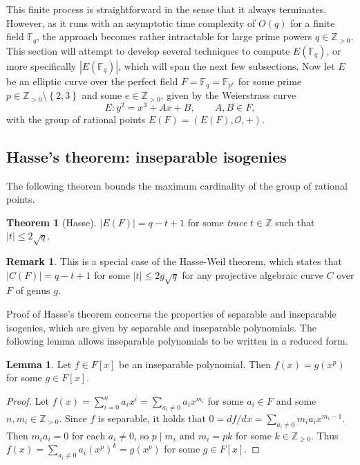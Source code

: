 \documentclass{article}
\newcommand{\F}{\mathbb{F}}
\newcommand{\Z}{\mathbb{Z}}
\newcommand{\rb}[1]{\left( #1 \right)}
\renewcommand{\sb}[1]{\left[ #1 \right]}
\newcommand{\cb}[1]{\left\{ #1 \right\}}
\newcommand{\abs}[1]{\left\lvert #1 \right\rvert}
\theoremstyle{definition}\newtheorem*{definition}{Definition}
\theoremstyle{definition}\newtheorem*{example}{Example}
\theoremstyle{definition}\newtheorem*{remark}{Remark}
\newtheorem{lemma}[proposition]{Lemma}
\newtheorem{theorem}[proposition]{Theorem}
\begin{document}
This finite process is straightforward in the sense that it always terminates. However, as it runs with an asymptotic time complexity of $ O\rb{q} $ for a finite field $ \F_q $, the approach becomes rather intractable for large prime powers $ q \in \Z_{> 0} $. This section will attempt to develop several techniques to compute $ E\rb{\F_q} $, or more specifically $ \abs{E\rb{\F_q}} $, which will span the next few subsections. Now let $ E $ be an elliptic curve over the perfect field $ F = \F_q = \F_{p^e} $ for some prime $ p \in \Z_{> 0} \setminus \cb{2, 3} $ and some $ e \in \Z_{> 0} $, given by the Weierstrass curve
$$ E : y^2 = x^3 + Ax + B, \qquad A, B \in F, $$
with the group of rational points $ E\rb{F} = \rb{E\rb{F}, \mathcal{O}, +} $. 

\subsection{Hasse's theorem: inseparable isogenies}

The following theorem bounds the maximum cardinality of the group of rational points.

\begin{theorem}[Hasse]
\label{thm:hasse}
$ \abs{E\rb{F}} = q - t + 1 $ for some \emph{trace} $ t \in \Z $ such that $ \abs{t} \le 2\sqrt{q} $.
\end{theorem}

\begin{remark}
This is a special case of the Hasse-Weil theorem, which states that $ \abs{C\rb{F}} = q - t + 1 $ for some $ \abs{t} \le 2g\sqrt{q} $ for any projective algebraic curve $ C $ over $ F $ of genus $ g $.
\end{remark}

Proof of Hasse's theorem concerns the properties of separable and inseparable isogenies, which are given by separable and inseparable polynomials. The following lemma allows inseparable polynomials to be written in a reduced form.

\begin{lemma}
Let $ f \in F\sb{x} $ be an inseparable polynomial. Then $ f\rb{x} = g\rb{x^p} $ for some $ g \in F\sb{x} $.
\end{lemma}

\begin{proof}
Let $ f\rb{x} = \sum_{i = 0}^n a_ix^i = \sum_{a_i \ne 0} a_ix^{m_i} $ for some $ a_i \in F $ and some $ n, m_i \in \Z_{> 0} $. Since $ f $ is separable, it holds that $ 0 = df / dx = \sum_{a_i \ne 0} m_ia_ix^{m_i - 1} $. Then $ m_ia_i = 0 $ for each $ a_i \ne 0 $, so $ p \mid m_i $ and $ m_i = pk $ for some $ k \in \Z_{\ge 0} $. Thus $ f\rb{x} = \sum_{a_i \ne 0} a_i\rb{x^p}^k = g\rb{x^p} $ for some $ g \in F\sb{x} $.
\end{proof}
\end{document}
